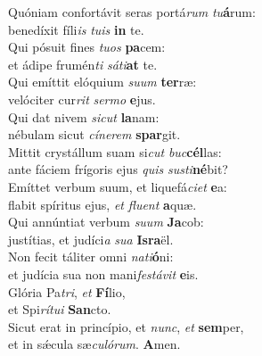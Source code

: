 \evenverse Quóniam confortávit seras portá\textit{rum} \textit{tu}\textbf{á}rum:~\*\\
\evenverse benedíxit fíli\textit{is} \textit{tu}\textit{is} \textbf{in} te.\\
\oddverse Qui pósuit fines \textit{tu}\textit{os} \textbf{pa}cem:~\*\\
\oddverse et ádipe frumén\textit{ti} \textit{sá}\textit{ti}\textbf{at} te.\\
\evenverse Qui emíttit elóquium \textit{su}\textit{um} \textbf{ter}ræ:~\*\\
\evenverse velóciter cur\textit{rit} \textit{ser}\textit{mo} \textbf{e}jus.\\
\oddverse Qui dat nivem \textit{si}\textit{cut} \textbf{la}nam:~\*\\
\oddverse nébulam sicut \textit{cí}\textit{ne}\textit{rem} \textbf{spar}git.\\
\evenverse Mittit crystállum suam si\textit{cut} \textit{buc}\textbf{cél}las:~\*\\
\evenverse ante fáciem frígoris ejus \textit{quis} \textit{su}\textit{sti}\textbf{né}bit?\\
\oddverse Emíttet verbum suum, et liquefá\textit{ci}\textit{et} \textbf{e}a:~\*\\
\oddverse flabit spíritus ejus, \textit{et} \textit{flu}\textit{ent} \textbf{a}quæ.\\
\evenverse Qui annúntiat verbum \textit{su}\textit{um} \textbf{Ja}cob:~\*\\
\evenverse justítias, et judíci\textit{a} \textit{su}\textit{a} \textbf{Is}\textbf{ra}ël.\\
\oddverse Non fecit táliter omni \textit{na}\textit{ti}\textbf{ó}ni:~\*\\
\oddverse et judícia sua non mani\textit{fe}\textit{stá}\textit{vit} \textbf{e}is.\\
\evenverse Glória Pa\textit{tri}, \textit{et} \textbf{Fí}lio,~\*\\
\evenverse et Spi\textit{rí}\textit{tu}\textit{i} \textbf{San}cto.\\
\oddverse Sicut erat in princípio, et \textit{nunc}, \textit{et} \textbf{sem}per,~\*\\
\oddverse et in sǽcula sæ\textit{cu}\textit{ló}\textit{rum}. \textbf{A}men.\\
